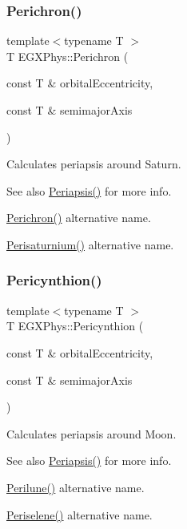 \subsubsection{\texorpdfstring{Perichron()}{Perichron()}}
{\footnotesize\ttfamily template$<$typename T $>$ \\
T E\+G\+X\+Phys\+::\+Perichron (\begin{DoxyParamCaption}\item[{const T \&}]{orbital\+Eccentricity,  }\item[{const T \&}]{semimajor\+Axis }\end{DoxyParamCaption})}



Calculates periapsis around Saturn. 

\begin{DoxySeeAlso}{See also}
\hyperlink{group___periapsis_ga4414ac75539371ec874a3d25cad6c9fe}{Periapsis()} for more info. 

\hyperlink{group___periapsis_ga12b5e99aa2e3e7031ef6ce93060cf516}{Perichron()} alternative name. 

\hyperlink{group___periapsis_ga60a50d09d29ebe47cbbfc125c2ea42bf}{Perisaturnium()} alternative name. 
\end{DoxySeeAlso}
\mbox{\label{group___periapsis_gaeeba153b188cd06cbd233eaef12f0a6a}} 
\subsubsection{\texorpdfstring{Pericynthion()}{Pericynthion()}}
{\footnotesize\ttfamily template$<$typename T $>$ \\
T E\+G\+X\+Phys\+::\+Pericynthion (\begin{DoxyParamCaption}\item[{const T \&}]{orbital\+Eccentricity,  }\item[{const T \&}]{semimajor\+Axis }\end{DoxyParamCaption})}



Calculates periapsis around Moon. 

\begin{DoxySeeAlso}{See also}
\hyperlink{group___periapsis_ga4414ac75539371ec874a3d25cad6c9fe}{Periapsis()} for more info. 

\hyperlink{group___periapsis_ga2cc7ab05e18d32c94d8d74972e032793}{Perilune()} alternative name. 

\hyperlink{group___periapsis_ga255874374dde571531e443cdbef9ef0c}{Periselene()} alternative name. 
\end{DoxySeeAlso}
\mbox{\label{group___periapsis_gaa270e364cbbd7d3d6212872df484926f}} 
